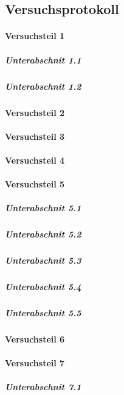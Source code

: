 \documentclass{subfiles}
\begin{document}
    \subsection*{Versuchsprotokoll} 
        

        \paragraph*{Versuchsteil 1}

            \subparagraph*{Unterabschnit 1.1}

            \subparagraph*{Unterabschnit 1.2}
            

        \paragraph*{Versuchsteil 2}

            
        \paragraph*{Versuchsteil 3}


        \paragraph*{Versuchsteil 4}

        
        \paragraph*{Versuchsteil 5}

            \subparagraph*{Unterabschnit 5.1}

            \subparagraph*{Unterabschnit 5.2}

            \subparagraph*{Unterabschnit 5.3}

            \subparagraph*{Unterabschnit 5.4}

            \subparagraph*{Unterabschnit 5.5}
    
            
        \paragraph*{Versuchsteil 6}

        
        \paragraph*{Versuchsteil 7}

            \subparagraph*{Unterabschnit 7.1}
\end{document}
